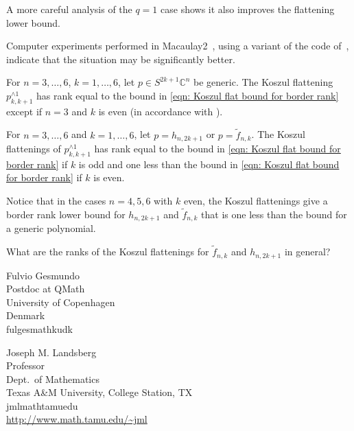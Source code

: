 \documentclass{toc}
\newcommand{\vvirg}{ , \dots , }
\newcommand{\bbC}{\mathbb{C}}
\renewcommand{\tilde}[1]{\widetilde{#1}}
\begin{document}
 \begin{remark}
A more careful analysis of the $q=1$ case shows it also improves the flattening lower bound.
\end{remark}

\begin{remark}\label{koscomputer}
Computer experiments performed in Macaulay2~\cite{M2}, using a variant of the code of~\cite{OedOtt:EgnvectorsTensorsAlgorithmsWaringDecomp}, indicate that the situation may be significantly better. 

For $ n = 3 \vvirg 6$, $k = 1 \vvirg 6$, let $p \in S^{2k+1}\bbC^n$ be generic. The Koszul flattening $p_{k,k+1}^{\wedge 1}$ has rank equal to the bound in \eqref{eqn: Koszul flat bound for border rank} except if $n=3$ and $k$ is even (in accordance with ).

For  $n = 3 \vvirg 6$ and $k= 1 \vvirg 6$, let $p = h_{n,2k+1}$ or $p = \tilde f_{n,k}$. The Koszul flattenings of $p_{k,k+1}^{\wedge 1}$ has rank equal to the bound in \eqref{eqn: Koszul flat bound for border rank} if $k$ is odd and one less than the bound in \eqref{eqn: Koszul flat bound for border rank} if $k$ is even.
\end{remark}

Notice that in the cases $n=4,5,6$ with $k$ even, the Koszul flattenings give a border rank lower bound for $h_{n,2k+1}$ and $\tilde f_{n,k}$ that is one less than the bound for a generic polynomial.


\begin{question} What are the ranks of the Koszul flattenings for $\tilde f_{n,k}$ and $h_{n,2k+1}$ in general?
\end{question}


%
%


\begin{tocauthors}
\begin{tocinfo}[gesmundo]
 Fulvio Gesmundo\\
 Postdoc at QMath\\
 University of Copenhagen\\
 Denmark \\
 fulges\tocat{}math\tocdot{}ku\tocdot{}dk \\
\end{tocinfo}
\begin{tocinfo}[landsberg]
Joseph M. Landsberg \\
Professor\\
Dept.\ of Mathematics \\
Texas A\&M University, College Station, TX\\
jml\tocat{}math\tocdot{}tamu\tocdot{}edu \\
  \url{http://www.math.tamu.edu/~jml}
\end{tocinfo}
\end{tocauthors}
\end{document}
